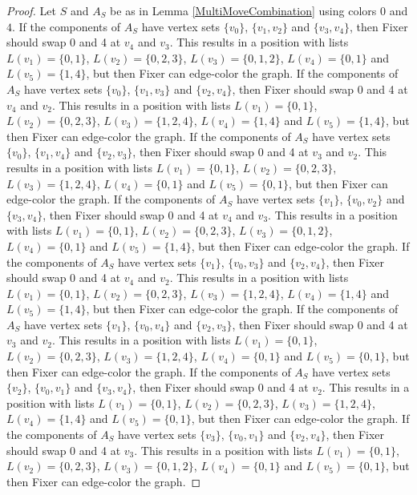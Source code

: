 \documentclass[12pt]{amsart}
\theoremstyle{plain}
\theoremstyle{definition}
\theoremstyle{remark}
\begin{document}
\begin{proof}
Let $S$ and $A_S$ be as in Lemma \ref{MultiMoveCombination} using colors $0$ and $4$. If the components of $A_S$ have vertex sets $\{v_0\}$, $\{v_1, v_2\}$ and $\{v_3, v_4\}$, then Fixer should swap 0 and 4 at $v_4$ and $v_3$. This results in a position with lists $L(v_1) = \{0, 1\}$, $L(v_2) = \{0, 2, 3\}$, $L(v_3) = \{0, 1, 2\}$, $L(v_4) = \{0, 1\}$ and $L(v_5) = \{1, 4\}$, but then Fixer can edge-color the graph.
If the components of $A_S$ have vertex sets $\{v_0\}$, $\{v_1, v_3\}$ and $\{v_2, v_4\}$, then Fixer should swap 0 and 4 at $v_4$ and $v_2$. This results in a position with lists $L(v_1) = \{0, 1\}$, $L(v_2) = \{0, 2, 3\}$, $L(v_3) = \{1, 2, 4\}$, $L(v_4) = \{1, 4\}$ and $L(v_5) = \{1, 4\}$, but then Fixer can edge-color the graph.
If the components of $A_S$ have vertex sets $\{v_0\}$, $\{v_1, v_4\}$ and $\{v_2, v_3\}$, then Fixer should swap 0 and 4 at $v_3$ and $v_2$. This results in a position with lists $L(v_1) = \{0, 1\}$, $L(v_2) = \{0, 2, 3\}$, $L(v_3) = \{1, 2, 4\}$, $L(v_4) = \{0, 1\}$ and $L(v_5) = \{0, 1\}$, but then Fixer can edge-color the graph.
If the components of $A_S$ have vertex sets $\{v_1\}$, $\{v_0, v_2\}$ and $\{v_3, v_4\}$, then Fixer should swap 0 and 4 at $v_4$ and $v_3$. This results in a position with lists $L(v_1) = \{0, 1\}$, $L(v_2) = \{0, 2, 3\}$, $L(v_3) = \{0, 1, 2\}$, $L(v_4) = \{0, 1\}$ and $L(v_5) = \{1, 4\}$, but then Fixer can edge-color the graph.
If the components of $A_S$ have vertex sets $\{v_1\}$, $\{v_0, v_3\}$ and $\{v_2, v_4\}$, then Fixer should swap 0 and 4 at $v_4$ and $v_2$. This results in a position with lists $L(v_1) = \{0, 1\}$, $L(v_2) = \{0, 2, 3\}$, $L(v_3) = \{1, 2, 4\}$, $L(v_4) = \{1, 4\}$ and $L(v_5) = \{1, 4\}$, but then Fixer can edge-color the graph.
If the components of $A_S$ have vertex sets $\{v_1\}$, $\{v_0, v_4\}$ and $\{v_2, v_3\}$, then Fixer should swap 0 and 4 at $v_3$ and $v_2$. This results in a position with lists $L(v_1) = \{0, 1\}$, $L(v_2) = \{0, 2, 3\}$, $L(v_3) = \{1, 2, 4\}$, $L(v_4) = \{0, 1\}$ and $L(v_5) = \{0, 1\}$, but then Fixer can edge-color the graph.
If the components of $A_S$ have vertex sets $\{v_2\}$, $\{v_0, v_1\}$ and $\{v_3, v_4\}$, then Fixer should swap 0 and 4 at $v_2$. This results in a position with lists $L(v_1) = \{0, 1\}$, $L(v_2) = \{0, 2, 3\}$, $L(v_3) = \{1, 2, 4\}$, $L(v_4) = \{1, 4\}$ and $L(v_5) = \{0, 1\}$, but then Fixer can edge-color the graph.
If the components of $A_S$ have vertex sets $\{v_3\}$, $\{v_0, v_1\}$ and $\{v_2, v_4\}$, then Fixer should swap 0 and 4 at $v_3$. This results in a position with lists $L(v_1) = \{0, 1\}$, $L(v_2) = \{0, 2, 3\}$, $L(v_3) = \{0, 1, 2\}$, $L(v_4) = \{0, 1\}$ and $L(v_5) = \{0, 1\}$, but then Fixer can edge-color the graph.

\end{proof}
\end{document}
